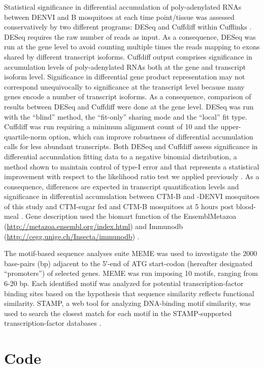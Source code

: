 Statistical significance in differential accumulation of poly-adenylated RNAs between DENVI and B mosquitoes at each time point/tissue was assessed conservatively by two different programs: DESeq and Cuffdiff within Cufflinks \cite{Anders2010,Trapnell2010}. DESeq requires the raw number of reads as input. As a consequence, DESeq was run at the gene level to avoid counting multiple times the reads mapping to exons shared by different transcript isoforms. Cuffdiff output comprises significance in accumulation levels of poly-adenylated RNAs both at the gene and transcript isoform level. Significance in differential gene product representation may not correspond unequivocally to significance at the transcript level because many genes encode a number of transcript isoforms. As a consequence, comparison of results between DESeq and Cuffdiff were done at the gene level. DESeq was run with the “blind” method, the “fit-only” sharing mode and the “local” fit type. Cuffdiff was run requiring a minimum alignment count of 10 and the upper-quartile-norm option, which can improve robustness of differential accumulation calls for less abundant transcripts. Both DESeq and Cuffdiff assess significance in differential accumulation fitting data to a negative binomial distribution, a method shown to maintain control of type-I error and that represents a statistical improvement with respect to the likelihood ratio test we applied previously \cite{bonizzoni2012strain,Anders2010}. As a consequence, differences are expected in transcript quantification levels and significance in differential accumulation between CTM-B and -DENVI mosquitoes of this study and CTM-sugar fed and CTM-B mosquitoes at 5 hours post blood-meal \cite{bonizzoni2012strain}. Gene description used the biomart function of the EnsemblMetazoa (\url{http://metazoa.ensembl.org/index.html}) and Immunodb (\url{http://cegg.unige.ch/Insecta/immunodb}) \cite{Kersey2012,Waterhouse2007}.

The motif-based sequence analyses suite MEME \cite{Bailey1994} was used to investigate the 2000 base-pairs (bp) adjacent to the 5′-end of ATG start-codon (hereafter designated “promoters”) of selected genes. MEME was run imposing 10 motifs, ranging from 6-20 bp. Each identified motif was analyzed for potential transcription-factor binding sites based on the hypothesis that sequence similarity reflects functional similarity. STAMP, a web tool for analyzing DNA-binding motif similarity, was used to search the closest match for each motif in the STAMP-supported transcription-factor databases \cite{Mahony2007stamp}.



\chapter{Code}


